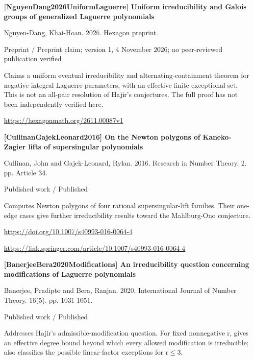 \documentclass[11pt,a4paper,oneside,openany]{book}
\begin{document}
{\sffamily\bfseries\color{atlasgreen}[NguyenDang2026UniformLaguerre] Uniform irreducibility and Galois groups of generalized Laguerre polynomials}\par
\color{black} Nguyen-Dang, Khai-Hoan. 2026. Hexagon preprint.\par
{\small\sffamily\color{atlasgold}Preprint / Preprint claim; version 1, 4 November 2026; no peer-reviewed publication verified}\par
\color{black} Claims a uniform eventual irreducibility and alternating-containment theorem for negative-integral Laguerre parameters, with an effective finite exceptional set. This is not an all-pair resolution of Hajir's conjectures. The full proof has not been independently verified here.\par
{\footnotesize\url{https://hexagonmath.org/2611.00087v1}}\par
\vspace{9pt}
\hypertarget{ref:CullinanGajekLeonard2016}{}
{\sffamily\bfseries\color{atlasgreen}[CullinanGajekLeonard2016] On the Newton polygons of Kaneko-Zagier lifts of supersingular polynomials}\par
\color{black} Cullinan, John and Gajek-Leonard, Rylan. 2016. Research in Number Theory. 2. pp. Article 34.\par
{\small\sffamily\color{atlasgold}Published work / Published}\par
\color{black} Computes Newton polygons of four rational supersingular-lift families. Their one-edge cases give further irreducibility results toward the Mahlburg-Ono conjecture.\par
{\footnotesize\url{https://doi.org/10.1007/s40993-016-0064-4}}\par
{\footnotesize\url{https://link.springer.com/article/10.1007/s40993-016-0064-4}}\par
\vspace{9pt}
\hypertarget{ref:BanerjeeBera2020Modifications}{}
{\sffamily\bfseries\color{atlasgreen}[BanerjeeBera2020Modifications] An irreducibility question concerning modifications of Laguerre polynomials}\par
\color{black} Banerjee, Pradipto and Bera, Ranjan. 2020. International Journal of Number Theory. 16(5). pp. 1031-1051.\par
{\small\sffamily\color{atlasgold}Published work / Published}\par
\color{black} Addresses Hajir's admissible-modification question. For fixed nonnegative r, gives an effective degree bound beyond which every allowed modification is irreducible; also classifies the possible linear-factor exceptions for r\ensuremath{\le}3.\par
\end{document}
